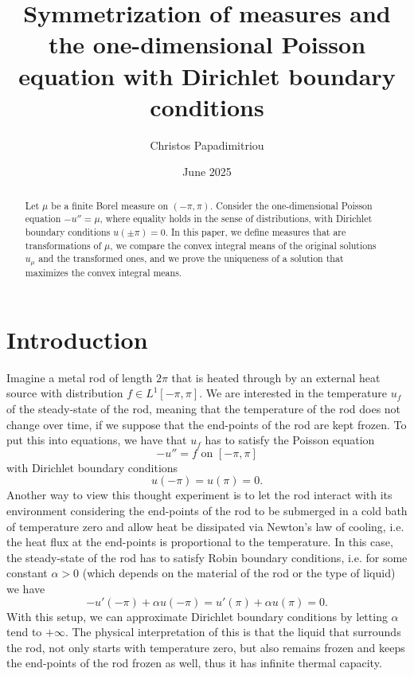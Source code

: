 \documentclass[11pt]{amsart}
\title[Symmetrization and the Poisson equation]{Symmetrization of measures and the one-dimensional Poisson equation with Dirichlet boundary conditions}
\author{Christos Papadimitriou}
\date{June 2025}
\numberwithin{equation}{section}
\begin{document}
\begin{abstract}
Let \(\mu\) be a finite Borel measure on \((-\pi,\pi)\). Consider the one-dimensional Poisson equation \(-u''=\mu\), where equality holds in the sense of distributions, with Dirichlet boundary conditions \(u(\pm\pi)=0\). In this paper, we define measures that are transformations of \(\mu\), we compare the convex integral means of the original solutions \(u_\mu\) and the transformed ones, and we prove the uniqueness of a solution that maximizes the convex integral means. 
\end{abstract}
\maketitle
\section{Introduction}
Imagine a metal rod of length \(2\pi\) that is heated through by an external heat source with distribution \(f\in L^1[-\pi,\pi]\). We are interested in the temperature \(u_f\) of the steady-state of the rod, meaning that the temperature of the rod does not change over time, if we suppose that the end-points of the rod are kept frozen.
To put this into equations, we have that \(u_f\) has to satisfy the Poisson equation
\begin{equation}\label{poissoneq}
    -u''=f\text{ on \([-\pi,\pi]\)}
\end{equation}
with Dirichlet boundary conditions
\begin{equation}\label{dirichletcond}
    u(-\pi)=u(\pi)=0.
\end{equation}
Another way to view this thought experiment is to let the rod interact with its environment considering the end-points of the rod to be submerged in a cold bath of temperature zero and allow heat be dissipated via Newton's law of cooling, i.e. the heat flux at the end-points is proportional to the temperature. In this case, the steady-state of the rod has to satisfy Robin boundary conditions, i.e. for some constant \(\alpha>0\) (which depends on the material of the rod or the type of liquid) we have
\begin{equation}\label{Robin}
-u'(-\pi)+\alpha u(-\pi)=u'(\pi)+\alpha u(\pi)=0.
\end{equation}
With this setup, we can approximate Dirichlet boundary conditions by letting \(\alpha\) tend to \(+\infty\). The physical interpretation of this is that the liquid that surrounds the rod, not only starts with temperature zero, but also remains frozen and keeps the end-points of the rod frozen as well, thus it has infinite thermal capacity.
\end{document}
